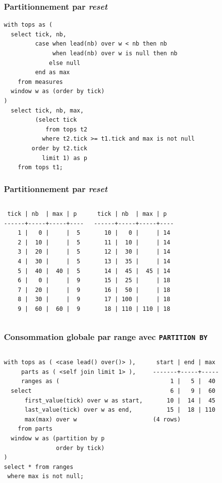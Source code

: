 \documentclass{beamer}
\begin{document}
\begin{frame}[fragile]
  \frametitle{Partitionnement par \textit{reset}}

\begin{verbatim}
with tops as (
  select tick, nb,
         case when lead(nb) over w < nb then nb
              when lead(nb) over w is null then nb
             else null
         end as max
    from measures
  window w as (order by tick)
)
  select tick, nb, max,
         (select tick
            from tops t2
           where t2.tick >= t1.tick and max is not null
        order by t2.tick
           limit 1) as p
    from tops t1;
\end{verbatim}
\end{frame}

\begin{frame}[fragile]
  \frametitle{Partitionnement par \textit{reset}}

\begin{columns}
\begin{verbatim}
 tick | nb  | max | p  
------+-----+-----+----
    1 |   0 |     |  5
    2 |  10 |     |  5
    3 |  20 |     |  5
    4 |  30 |     |  5
    5 |  40 |  40 |  5
    6 |   0 |     |  9
    7 |  20 |     |  9
    8 |  30 |     |  9
    9 |  60 |  60 |  9
\end{verbatim}

\begin{verbatim}
 tick | nb  | max | p  
------+-----+-----+----
   10 |   0 |     | 14
   11 |  10 |     | 14
   12 |  30 |     | 14
   13 |  35 |     | 14
   14 |  45 |  45 | 14
   15 |  25 |     | 18
   16 |  50 |     | 18
   17 | 100 |     | 18
   18 | 110 | 110 | 18
\end{verbatim}
\end{columns}
\end{frame}

\begin{frame}[fragile]
  \frametitle{Consommation globale par range avec \texttt{PARTITION BY}}

\begin{columns}
\begin{verbatim}
with tops as ( <case lead() over()> ),
     parts as ( <self join limit 1> ),
     ranges as (
  select
      first_value(tick) over w as start,
      last_value(tick) over w as end,
      max(max) over w
    from parts
  window w as (partition by p
               order by tick)
)
select * from ranges
 where max is not null;
\end{verbatim}

\begin{verbatim}
 start | end | max 
-------+-----+-----
     1 |   5 |  40
     6 |   9 |  60
    10 |  14 |  45
    15 |  18 | 110
(4 rows)
\end{verbatim}
\end{columns}
\end{frame}
\end{document}
